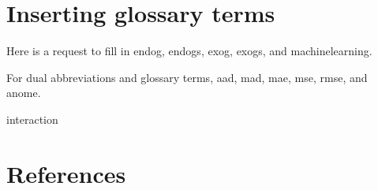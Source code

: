 \documentclass[10pt, letterpaper, twoside]{article}
\begin{document}
\section{Inserting glossary terms}\label{sec:glossary_terms}

Here is a request to fill in \gls{endog}, \glspl{endog}, \gls{exog}, \glspl{exog}, and \gls{machinelearning}.

For dual abbreviations and glossary terms, \gls{aad}, \gls{mad}, \gls{mae}, \gls{mse}, \gls{rmse}, and \gls{anome}.

\gls{interaction}



\newpage
\printunsrtglossary[type={abbreviations}]

\newpage
\printunsrtglossary[style={indexgroup}]

\newpage
\section{References}\label{sec:references}
\nocite{*}
\printbibliography[heading=none]
\end{document}
